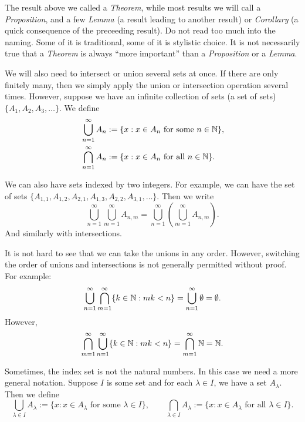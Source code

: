 The result above we called a \emph{Theorem}, while most results we will call
a \emph{Proposition}, and a few \emph{Lemma} (a result leading to another result) or
\emph{Corollary} (a quick consequence of the preceeding result).  Do not read too much into
the naming.  Some of it is traditional, some of it is stylistic choice.
It is not necessarily true that a \emph{Theorem} is always ``more important'' than a
\emph{Proposition} or a \emph{Lemma}.

We will also need to intersect or union several sets at once.  If there are
only finitely many, then we simply apply the union or intersection operation
several times.  However, suppose we have an infinite collection
of sets (a set of sets)
$\{ A_1, A_2, A_3, \ldots \}$.  We define
\begin{align*}
& \bigcup_{n=1}^\infty A_n := \{ x : x \in A_n \text{ for some $n \in {\mathbb{N}}$}
\} , \\
& \bigcap_{n=1}^\infty A_n := \{ x : x \in A_n \text{ for all $n \in {\mathbb{N}}$}
\} .
\end{align*}

We can also have sets indexed by two integers.  For example, we can have
the set of sets
$\{ A_{1,1}, A_{1,2}, A_{2,1}, A_{1,3}, A_{2,2}, A_{3,1}, \ldots \}$.  Then
we write 
\begin{equation*}
\bigcup_{n=1}^\infty \bigcup_{m=1}^\infty A_{n,m}
=
\bigcup_{n=1}^\infty \left( \bigcup_{m=1}^\infty A_{n,m} \right) .
\end{equation*}
And similarly with intersections.

It is not hard to see that we can take the unions in any order.  However,
switching the order of unions and intersections is not generally permitted without proof.
For example:
\begin{equation*}
\bigcup_{n=1}^\infty
\bigcap_{m=1}^\infty
\{ k \in {\mathbb{N}} : mk < n \}
=
\bigcup_{n=1}^\infty \emptyset = \emptyset .
\end{equation*}
However,
\begin{equation*}
\bigcap_{m=1}^\infty
\bigcup_{n=1}^\infty
\{ k \in {\mathbb{N}} : mk < n \}
=
\bigcap_{m=1}^\infty
{\mathbb{N}}
=
{\mathbb{N}}.
\end{equation*}

Sometimes, the index set is not the natural numbers.  In this case we need a
more general notation.  Suppose $I$ is some set and for each $\lambda \in
I$, we have a set $A_\lambda$.  Then we define
\begin{equation*}
\bigcup_{\lambda \in I} A_\lambda := \{ x : x \in A_\lambda \text{ for some $\lambda \in I$}
\} ,
\qquad
\bigcap_{\lambda \in I} A_\lambda := \{ x : x \in A_\lambda \text{ for all $\lambda \in I$}
\} .
\end{equation*}

